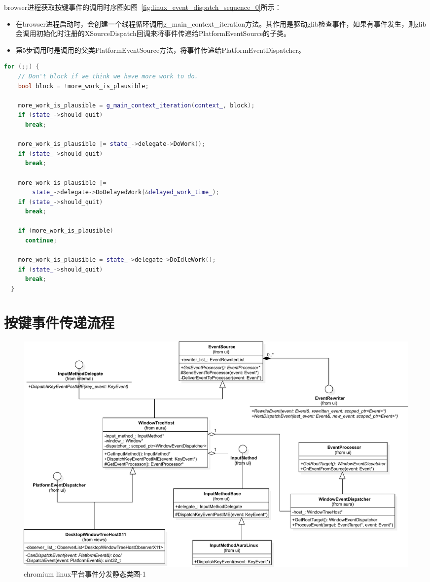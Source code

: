 \documentclass[12pt]{article}
\begin{document}
browser进程获取按键事件的调用时序图如图~\ref{fig:linux_event_dispatch_sequence_0}所示：
\begin{itemize}
  \item 在browser进程启动时，会创建一个线程循环调用g\_main\_context\_iteration方法。其作用是驱动glib检查事件，如果有事件发生，则glib会调用初始化时注册的XSourceDispatch回调来将事件传递给PlatformEventSource的子类。
  \item 第5步调用时是调用的父类PlatformEventSource方法，将事件传递给PlatformEventDispatcher。
\end{itemize}

\begin{spacing}{1.0}
\begin{lstlisting}[language={C++}]
  for (;;) {
    // Don't block if we think we have more work to do.
    bool block = !more_work_is_plausible;

    more_work_is_plausible = g_main_context_iteration(context_, block);
    if (state_->should_quit)
      break;

    more_work_is_plausible |= state_->delegate->DoWork();
    if (state_->should_quit)
      break;

    more_work_is_plausible |=
        state_->delegate->DoDelayedWork(&delayed_work_time_);
    if (state_->should_quit)
      break;

    if (more_work_is_plausible)
      continue;

    more_work_is_plausible = state_->delegate->DoIdleWork();
    if (state_->should_quit)
      break;
  }
\end{lstlisting}
\end{spacing}

\section{按键事件传递流程}


\begin{figure}[H] 
  \centering 
  \includegraphics[width=\textwidth]{image/linux_event_dispatch_class_1.pdf} 
  \caption{chromium linux平台事件分发静态类图-1} \label{fig:linux_event_dispatch_class_1} 
\end{figure}
\end{document}
